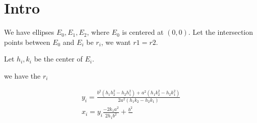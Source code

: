 \documentclass{article}
\begin{document}
	\section{Intro}
	We have ellipses $E_0, E_1, E_2$, where $E_0$ is centered at $(0,0)$. Let the intersection points between $E_0$ and $E_i$ be $r_i$, we want $r1=r2$.
	
	Let $h_i,k_i$ be the center of $E_i$.
	
	we have the $r_i$
	
	\begin{align}
	y_i = \frac{b^2(h_1h_2^2 - h_2h_1^2) + a^2(h_1k_2^2 - h_2k_1^2)}{2a^2(h_1k_2-h_2k_1)}\\
	x_i = y_i \frac{-2k_1a^2}{2h_1b^2} + \frac{b^2}{}
	\end{align}
\end{document}
